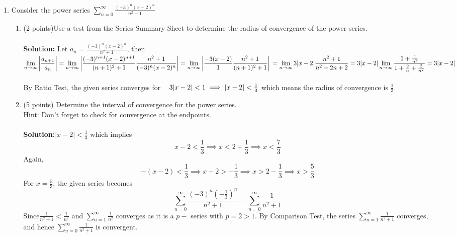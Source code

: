 \documentclass[paper=a4, fontsize=11pt]{scrartcl} %
\newcommand{\ds}{\displaystyle}
\numberwithin{equation}{section} %
\numberwithin{figure}{section} %
\numberwithin{table}{section} %
\begin{document}
\begin{enumerate}
\item Consider the power series $\ds\sum_{n=0}^{\infty}\frac{(-3)^n(x-2)^n}{n^2+1}$
\begin{enumerate} 
\item (2 points)\hspace{4mm}Use a test from the Series Summary Sheet to determine the radius of convergence of the power series.\\\\
\textbf{Solution:}\hspace{3mm} Let\hspace{3mm} $a_n=\frac{(-3)^n(x-2)^n}{n^2+1}$, \hspace{3mm} then\\
$\ds\lim\limits_{n\rightarrow\infty}\left|\frac{a_{n+1}}{a_n}\right|=\ds\lim\limits_{n\rightarrow\infty}\left|\ds\frac{(-3)^{n+1}(x-2)^{n+1}}{(n+1)^2+1}\frac{n^2+1}{(-3)^n(x-2)^n}\right|=\ds\lim\limits_{n\rightarrow\infty}\left|\frac{-3(x-2)}{1}\frac{n^2+1}{(n+1)^2+1}\right|\\=\ds\lim\limits_{n\rightarrow\infty}3|x-2|\ds\frac{n^2+1}{n^2+2n+2}=3|x-2|\lim\limits_{n\rightarrow\infty}\frac{1+\frac{1}{n^2}}{1+\frac{2}{n}+\frac{2}{n^2}}=3|x-2|$\\\\
By Ratio Test, the given series converges for $\hspace{3mm}3|x-2|<1\implies|x-2|<\frac{1}{3}$ which means the radius of convergence is  $\frac{1}{3}$.
\item (5 points)\hspace{4mm} Determine the interval of convergence for the power series. \\Hint:  Don't forget to
check for convergence at the endpoints.\\\\
\textbf{Solution:}\hspace{2mm}$|x-2|<\frac{1}{3}$ which implies
$$x-2<\frac{1}{3}\implies x<2+\frac{1}{3}\implies x<\frac{7}{3}$$
Again,
$$-(x-2)<\frac{1}{3}\implies x-2>-\frac{1}{3}\implies x>2-\frac{1}{3}\implies x>\frac{5}{3}$$
For $x=\frac{5}{3}$, the given series becomes
$$\sum_{n=0}^{\infty}\frac{(-3)^n(-\frac{1}{3})^n}{n^2+1}=\sum_{n=0}^{\infty}\frac{1}{n^2+1}$$
Since\hspace{3mm}$\frac{1}{n^2+1}<\frac{1}{n^2}$\hspace{2mm} and $\sum_{n=1}^{\infty}\frac{1}{n^2}$ converges as it is a $p-$ series with $p=2>1$. By Comparison Test, the series $\ds\sum_{n=1}^{\infty}\frac{1}{n^2+1}$ converges, and hence $\ds\sum_{n=0}^{\infty}\frac{1}{n^2+1}$ is convergent.\\\\

\end{enumerate}
\end{enumerate}
\end{document}
